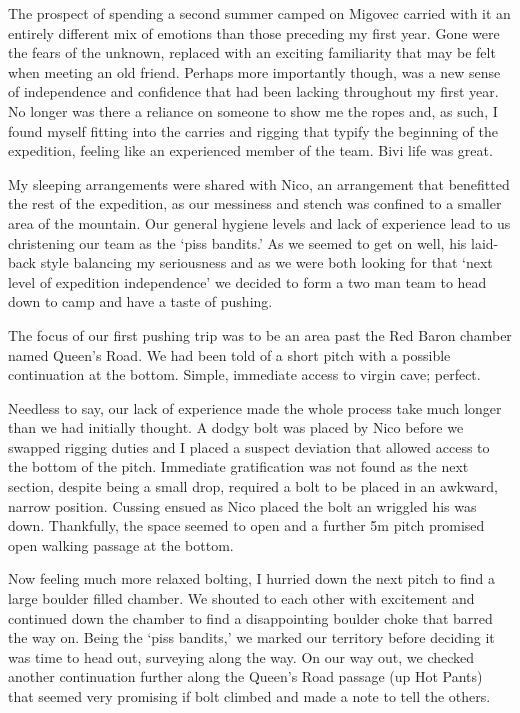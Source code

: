 The prospect of spending a second summer camped on Migovec carried with
it an entirely different mix of emotions than those preceding my first
year. Gone were the fears of the unknown, replaced with an exciting
familiarity that may be felt when meeting an old friend. Perhaps more
importantly though, was a new sense of independence and confidence that
had been lacking throughout my first year. No longer was there a
reliance on someone to show me the ropes and, as such, I found myself
fitting into the carries and rigging that typify the beginning of the
expedition, feeling like an experienced member of the team. Bivi life
was great.

My sleeping arrangements were shared with Nico, an arrangement that
benefitted the rest of the expedition, as our messiness and stench was
confined to a smaller area of the mountain. Our general hygiene levels
and lack of experience lead to us christening our team as the `piss
bandits.' As we seemed to get on well, his laid-back style balancing my
seriousness and as we were both looking for that `next level of
expedition independence' we decided to form a two man team to head down
to camp and have a taste of pushing.

The focus of our first pushing trip was to be an area past the Red Baron
chamber named Queen's Road. We had been told of a short pitch with a
possible continuation at the bottom. Simple, immediate access to virgin
cave; perfect.

Needless to say, our lack of experience made the whole process take much
longer than we had initially thought. A dodgy bolt was placed by Nico
before we swapped rigging duties and I placed a suspect deviation that
allowed access to the bottom of the pitch. Immediate gratification was
not found as the next section, despite being a small drop, required a
bolt to be placed in an awkward, narrow position. Cussing ensued as Nico
placed the bolt an wriggled his was down. Thankfully, the space seemed
to open and a further 5m pitch promised open walking passage at the
bottom.

Now feeling much more relaxed bolting, I hurried down the next pitch to
find a large boulder filled chamber. We shouted to each other with
excitement and continued down the chamber to find a disappointing
boulder choke that barred the way on. Being the `piss bandits,' we
marked our territory before deciding it was time to head out, surveying
along the way. On our way out, we checked another continuation further
along the Queen's Road passage (up Hot Pants) that seemed very promising
if bolt climbed and made a note to tell the others.

